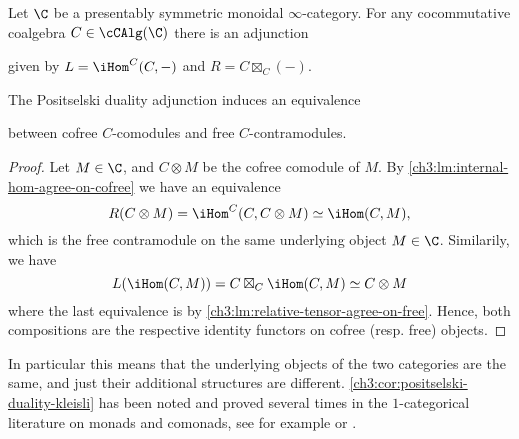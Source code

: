 \begin{theorem}
    Let $\C$ be a presentably symmetric monoidal $\infty$-category. For any cocommutative coalgebra $C\in \cCAlg(\C)$ there is an adjunction 
    \begin{center}
    \end{center}
    given by $L = \iHom^C(C,-)$ and $R = C\boxtimes_C (-)$. 
\end{theorem}


\begin{corollary}
    The Positselski duality adjunction induces an equivalence
    \begin{center}
    \end{center}
    between cofree $C$-comodules and free $C$-contramodules. 
\end{corollary}
\begin{proof}
    Let $M\in \C$, and $C\otimes M$ be the cofree comodule of $M$. By \cref{ch3:lm:internal-hom-agree-on-cofree} we have an equivalence 
    \[R(C\otimes M) = \iHom^C(C, C\otimes M)\simeq \iHom(C, M),\]
    which is the free contramodule on the same underlying object $M\in \C$. Similarily, we have 
    \[L(\iHom(C, M))= C\boxtimes_C \iHom(C, M) \simeq C\otimes M\] 
    where the last equivalence is by \cref{ch3:lm:relative-tensor-agree-on-free}. Hence, both compositions are the respective identity functors on cofree (resp. free) objects. 
\end{proof}

\begin{remark}
    In particular this means that the underlying objects of the two categories are the same, and just their additional structures are different. \cref{ch3:cor:positselski-duality-kleisli} has been noted and proved several times in the $1$-categorical literature on monads and comonads, see for example \cite[Theorem 3]{kleiner_1990} or \cite[2.5]{bohm-brzezinski-wisbauer_2009}. 
\end{remark}



